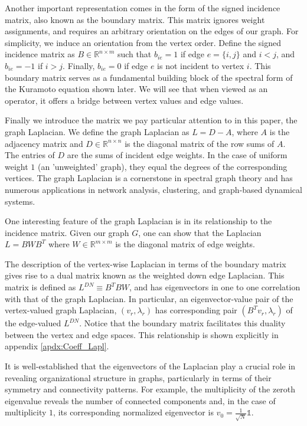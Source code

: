\documentclass[%
 aip,
 amsmath,amssymb,
preprint,
reprint, onecolumn %
]{revtex4-1}
\newcommand{\R}{\mathbb{R}}
\begin{document}
Another important representation comes in the form of the signed incidence matrix, also known as the boundary matrix. This matrix ignores weight assignments, and requires an arbitrary orientation on the edges of our graph. 
For simplicity, we induce an orientation from the vertex order. Define the signed incidence matrix as $B \in \R^{n\times m}$ such that $b_{ie}=1$ if edge $e=\{i,j\}$ and $i<j$, and $b_{ie}=-1$ if $i>j$. Finally, $b_{ie}=0$ if edge $e$ is not incident to vertex $i$. 
This boundary matrix serves as a fundamental building block of the spectral form of the Kuramoto equation shown later. We will see that when viewed as an operator, it offers a bridge between vertex values and edge values.

Finally we introduce the matrix we pay particular attention to in this paper, the graph Laplacian. We define the graph Laplacian as $L=D-A$, where $A$ is the adjacency matrix and $D\in \R^{n\times n}$ is the diagonal matrix of the row sums of $A$. The entries of $D$ are the sums of incident edge weights. In the case of uniform weight $1$ (an 'unweighted' graph), they equal the degrees of the corresponding vertices. The graph Laplacian is a cornerstone in spectral graph theory and has numerous applications in network analysis, clustering, and graph-based dynamical systems.\cite{Newman2018-ut}

One interesting feature of the graph Laplacian is in its relationship to the incidence matrix. Given our graph $G$, one can show that the Laplacian $L=BWB^T$ where $W\in \R^{m\times m}$ is the diagonal matrix of edge weights. 

The description of the vertex-wise Laplacian in terms of the boundary matrix gives rise to a dual matrix known as the weighted down edge Laplacian. This matrix is defined as $L^{DN} \equiv B^TBW$, and has eigenvectors in one to one correlation with that of the graph Laplacian. In particular, an eigenvector-value pair of the vertex-valued graph Laplacian, $(v_r,\lambda_r)$ has corresponding pair $(B^Tv_r,\lambda_r)$  of the edge-valued $L^{DN}$. Notice that the boundary matrix facilitates this duality between the vertex and edge spaces. This relationship is shown explicitly in appendix \ref{apdx:Coeff_Lapl}.

It is well-established that the eigenvectors of the Laplacian play a crucial role in revealing organizational structure in graphs, particularly in terms of their symmetry and connectivity patterns. For example, the multiplicity of the zeroth eigenvalue reveals the number of connected components and, in the case of multiplicity $1$, its corresponding normalized eigenvector is $v_0 = \frac{1}{\sqrt{N}}\mathbb{1}$. 
\end{document}
